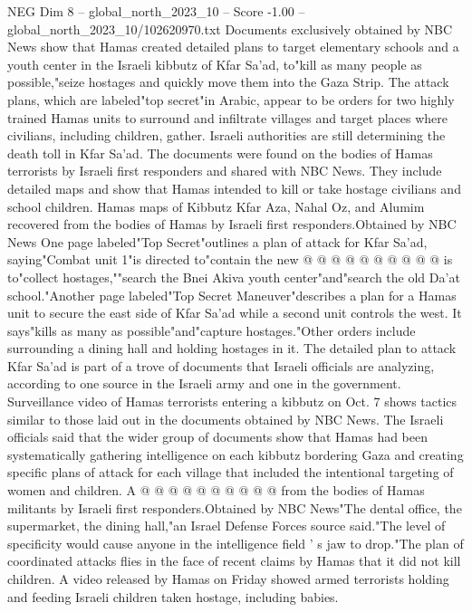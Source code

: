 \begin{textsample}{NEG Dim 8 – global\_north\_2023\_10 – Score -1.00 – global\_north\_2023\_10/102620970.txt}  \label{ex:f8_neg_211}
Documents exclusively obtained by NBC News show that Hamas created detailed plans to target elementary schools and a youth center in the Israeli kibbutz of Kfar Sa'ad, to"kill as many people as possible,"seize hostages and quickly move them into the Gaza Strip.
The attack plans, which are labeled"top secret"in Arabic, appear to be orders for two highly trained Hamas units to surround and infiltrate villages and target places where civilians, including children, gather.
Israeli authorities are still determining the death toll in Kfar Sa'ad.
The documents were found on the bodies of Hamas terrorists by Israeli first responders and shared with NBC News.
They include detailed maps and show that Hamas intended to kill or take hostage civilians and school children.
Hamas maps of Kibbutz Kfar Aza, Nahal Oz, and Alumim recovered from the bodies of Hamas by Israeli first responders.Obtained by NBC News One page labeled"Top Secret"outlines a plan of attack for Kfar Sa'ad, saying"Combat unit 1"is directed to"contain the new @ @ @ @ @ @ @ @ @ @ is to"collect hostages,""search the Bnei Akiva youth center"and"search the old Da'at school."Another page labeled"Top Secret Maneuver"describes a plan for a Hamas unit to secure the east side of Kfar Sa'ad while a second unit controls the west.
It says"kills as many as possible"and"capture hostages."Other orders include surrounding a dining hall and holding hostages in it.
The detailed plan to attack Kfar Sa'ad is part of a trove of documents that Israeli officials are analyzing, according to one source in the Israeli army and one in the government.
Surveillance video of Hamas terrorists entering a kibbutz on Oct. 7 shows tactics similar to those laid out in the documents obtained by NBC News.
The Israeli officials said that the wider group of documents show that Hamas had been systematically gathering intelligence on each kibbutz bordering Gaza and creating specific plans of attack for each village that included the intentional targeting of women and children.
A @ @ @ @ @ @ @ @ @ @ from the bodies of Hamas militants by Israeli first responders.Obtained by NBC News"The dental office, the supermarket, the dining hall,"an Israel Defense Forces source said."The level of specificity would cause anyone in the intelligence field ' s jaw to drop."The plan of coordinated attacks flies in the face of recent claims by Hamas that it did not kill children.
A video released by Hamas on Friday showed armed terrorists holding and feeding Israeli children taken hostage, including babies.

\end{textsample}
